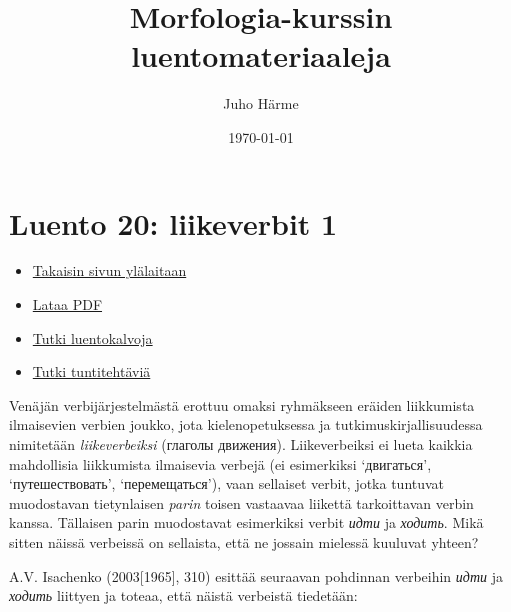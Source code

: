 \documentclass[]{scrartcl}
\author{Juho Härme}
\title{Morfologia-kurssin luentomateriaaleja}
\date{\today}
\providecommand{\tightlist}{%
  \setlength{\itemsep}{0pt}\setlength{\parskip}{0pt}}
\begin{document}
\maketitle
\tableofcontents
\newpage



\section{Luento 20: liikeverbit 1}\label{luento-20-liikeverbit-1}

\begin{itemize}
\tightlist
\item
  \href{https://mustikka.uta.fi/~juho_harme/morfologia/\#tästä-kurssista}{Takaisin
  sivun ylälaitaan}
\item
  \href{http://mustikka.uta.fi/~juho_harme/morfologia/materiaalit/luento20.pdf}{Lataa
  PDF}
\item
  \href{http://mustikka.uta.fi/~juho_harme/morfologia/presentations/luento20.html}{Tutki
  luentokalvoja}
\item
  \href{http://mustikka.uta.fi/~juho_harme/morfologia/tehtavat/luento20.pdf}{Tutki
  tuntitehtäviä}
\end{itemize}

Venäjän verbijärjestelmästä erottuu omaksi ryhmäkseen eräiden
liikkumista ilmaisevien verbien joukko, jota kielenopetuksessa ja
tutkimuskirjallisuudessa nimitetään \emph{liikeverbeiksi} (глаголы
движения). Liikeverbeiksi ei lueta kaikkia mahdollisia liikkumista
ilmaisevia verbejä (ei esimerkiksi `двигаться', `путешествовать',
`перемещаться'), vaan sellaiset verbit, jotka tuntuvat muodostavan
tietynlaisen \emph{parin} toisen vastaavaa liikettä tarkoittavan verbin
kanssa. Tällaisen parin muodostavat esimerkiksi verbit \emph{идти} ja
\emph{ходить}. Mikä sitten näissä verbeissä on sellaista, että ne
jossain mielessä kuuluvat yhteen?

A.V. Isachenko (2003{[}1965{]}, 310) esittää seuraavan pohdinnan
verbeihin \emph{идти} ja \emph{ходить} liittyen ja toteaa, että näistä
verbeistä tiedetään:
\end{document}
